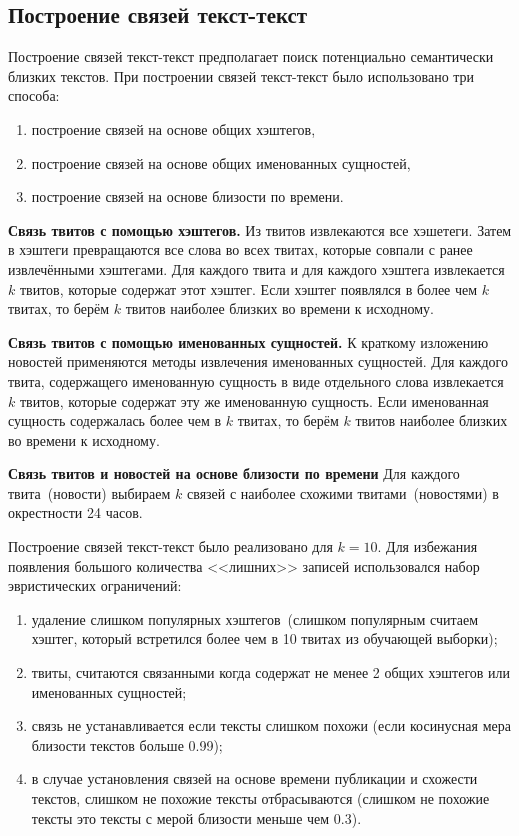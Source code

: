 \subsection{Построение связей текст-текст}
    Построение связей текст-текст предполагает поиск потенциально семантически близких текстов.
    При построении связей текст-текст было использовано три способа:
    \begin{enumerate}
        \item построение связей на основе общих хэштегов,
        \item построение связей на основе общих именованных сущностей,
        \item построение связей на основе близости по времени.
    \end{enumerate}

    \textbf{Связь твитов с помощью хэштегов.}
        Из твитов извлекаются все хэшетеги.
        Затем в хэштеги превращаются все слова во всех твитах, которые совпали с ранее извлечёнными хэштегами.
        Для каждого твита и для каждого хэштега извлекается $k$ твитов, которые содержат этот хэштег.
        Если хэштег появлялся в более чем $k$ твитах, то берём $k$ твитов наиболее близких во времени к исходному.

    \textbf{Связь твитов с помощью именованных сущностей.}
        К краткому изложению новостей применяются методы извлечения именованных сущностей.
        Для каждого твита, содержащего именованную сущность в виде отдельного слова извлекается $k$ твитов, которые содержат эту же именованную сущность.
        Если именованная сущность содержалась более чем в $k$ твитах, то берём $k$ твитов наиболее близких во времени к исходному.

    \textbf{Связь твитов и новостей на основе близости по времени}
        Для каждого твита~(новости) выбираем $k$ связей с наиболее схожими твитами~(новостями) в окрестности 24 часов.

    Построение связей текст-текст было реализовано для $k=10$. Для избежания появления большого количества <<лишних>> записей использовался набор эвристических ограничений:
    \begin{enumerate}
        \item удаление слишком популярных хэштегов~(слишком популярным считаем хэштег, который встретился более чем в 10 твитах из обучающей выборки);
        \item твиты, считаются связанными когда содержат не менее 2 общих хэштегов или именованных сущностей;
        \item связь не устанавливается если тексты слишком похожи (если косинусная мера близости текстов больше 0.99);
        \item в случае установления связей на основе времени публикации и схожести текстов, слишком не похожие тексты отбрасываются
        (слишком не похожие тексты это тексты с мерой близости меньше чем 0.3).
    \end{enumerate}

